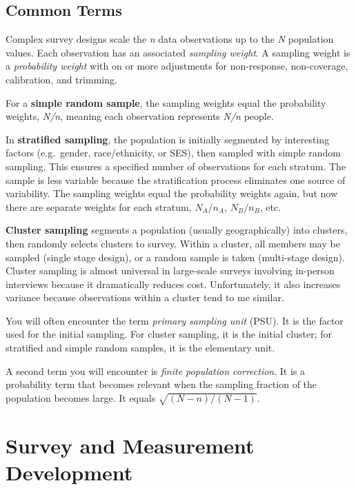 \documentclass[
]{book}
\theoremstyle{definition}
\theoremstyle{definition}
\theoremstyle{definition}
\theoremstyle{definition}
\theoremstyle{remark}
\begin{document}
\hypertarget{common-terms}{%
\section*{Common Terms}\label{common-terms}}

Complex survey designs scale the \emph{n} data observations up to the \emph{N} population values. Each observation has an associated \emph{sampling weight}. A sampling weight is a \emph{probability weight} with on or more adjustments for non-response, non-coverage, calibration, and trimming.

For a \textbf{simple random sample}, the sampling weights equal the probability weights, \emph{N/n}, meaning each observation represents \emph{N/n} people.

In \textbf{stratified sampling}, the population is initially segmented by interesting factors (e.g.~gender, race/ethnicity, or SES), then sampled with simple random sampling. This ensures a specified number of observations for each stratum. The sample is less variable because the stratification process eliminates one source of variability. The sampling weights equal the probability weights again, but now there are separate weights for each stratum, \(N_A / n_A\), \(N_B / n_B\), etc.

\textbf{Cluster sampling} segments a population (usually geographically) into clusters, then randomly selects clusters to survey. Within a cluster, all members may be sampled (single stage design), or a random sample is taken (multi-stage design). Cluster sampling is almost universal in large-scale surveys involving in-person interviews because it dramatically reduces cost. Unfortunately, it also increases variance because observations within a cluster tend to me similar.

You will often encounter the term \emph{primary sampling unit} (PSU). It is the factor used for the initial sampling. For cluster sampling, it is the initial cluster; for stratified and simple random samples, it is the elementary unit.

A second term you will encounter is \emph{finite population correction}. It is a probability term that becomes relevant when the sampling fraction of the population becomes large. It equals \(\sqrt{(N-n)/(N-1)}\).

\hypertarget{survey-and-measurement-development}{%
\chapter{Survey and Measurement Development}\label{survey-and-measurement-development}}
\end{document}
